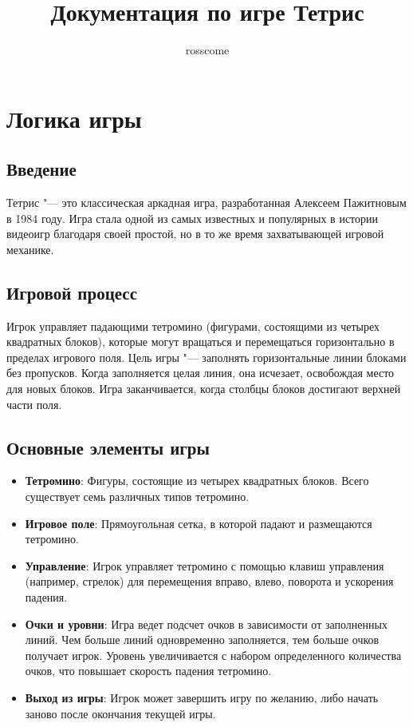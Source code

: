 \documentclass{article}
\title{Документация по игре Тетрис}
\author{rosscome}
\begin{document}
\maketitle

\section*{Логика игры}

\subsection*{Введение}
Тетрис "--- это классическая аркадная игра, разработанная Алексеем Пажитновым в 1984 году. Игра стала одной из самых известных и популярных в истории видеоигр благодаря своей простой, но в то же время захватывающей игровой механике.

\subsection*{Игровой процесс}
Игрок управляет падающими тетромино (фигурами, состоящими из четырех квадратных блоков), которые могут вращаться и перемещаться горизонтально в пределах игрового поля. Цель игры "--- заполнять горизонтальные линии блоками без пропусков. Когда заполняется целая линия, она исчезает, освобождая место для новых блоков. Игра заканчивается, когда столбцы блоков достигают верхней части поля.

\subsection*{Основные элементы игры}
\begin{itemize}
    \item \textbf{Тетромино}: Фигуры, состоящие из четырех квадратных блоков. Всего существует семь различных типов тетромино.
    \item \textbf{Игровое поле}: Прямоугольная сетка, в которой падают и размещаются тетромино.
    \item \textbf{Управление}: Игрок управляет тетромино с помощью клавиш управления (например, стрелок) для перемещения вправо, влево, поворота и ускорения падения.
    \item \textbf{Очки и уровни}: Игра ведет подсчет очков в зависимости от заполненных линий. Чем больше линий одновременно заполняется, тем больше очков получает игрок. Уровень увеличивается с набором определенного количества очков, что повышает скорость падения тетромино.
    \item \textbf{Выход из игры}: Игрок может завершить игру по желанию, либо начать заново после окончания текущей игры.
\end{itemize}
\end{document}
